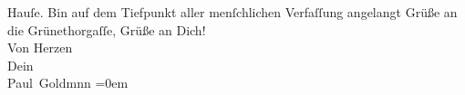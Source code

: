 \begin{ledgroupsized}[t]{13cm}
               Hauſe. Bin auf dem Tiefpunkt aller menſchlichen Verfaſſung angelangt{\dotsfour}\pend
           \pstart
           Grüße an die Grünethorgaſſe, Grüße an Dich! {\\[\baselineskip]}Von Herzen {\\[\baselineskip]}Dein {\\[\baselineskip]}\spacefill\mbox{Paul Goldmnn}\pend
           \leftskip=0em{}
         
         \endnumbering{}\end{ledgroupsized}  \newcommand{\dateiname}{L03064}\newcommand{\titel}{Paul Goldmann an Arthur Schnitzler, 26. 4. [1901]}\newcommand{\editorInnen}{Martin Anton Müller und Laura Untner}
      